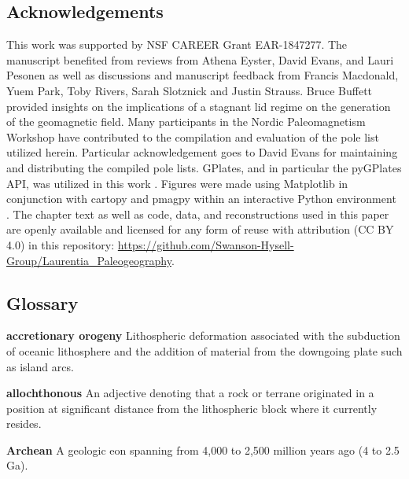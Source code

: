 \documentclass[twocolumn, switch]{article} %
\begin{document}

\footnotesize
\subsection*{Acknowledgements}
This work was supported by NSF CAREER Grant EAR-1847277. The manuscript benefited from reviews from Athena Eyster, David Evans, and Lauri Pesonen as well as discussions and manuscript feedback from Francis Macdonald, Yuem Park, Toby Rivers, Sarah Slotznick and Justin Strauss. Bruce Buffett provided insights on the implications of a stagnant lid regime on the generation of the geomagnetic field. Many participants in the Nordic Paleomagnetism Workshop have contributed to the compilation and evaluation of the pole list utilized herein. Particular acknowledgement goes to David Evans for maintaining and distributing the compiled pole lists. GPlates, and in particular the pyGPlates API, was utilized in this work \citep{Muller2018b}. Figures were made using Matplotlib \citep{Hunter2007a} in conjunction with cartopy \citep{Met-Office2010a} and pmagpy \citep{Tauxe2016a} within an interactive Python environment \citep{Perez2007a}. The chapter text as well as code, data, and reconstructions used in this paper are openly available and licensed for any form of reuse with attribution (CC BY 4.0) in this repository: \url{https://github.com/Swanson-Hysell-Group/Laurentia_Paleogeography}.

\printendnotes

\subsection*{Glossary}
\noindent\textbf{accretionary orogeny } Lithospheric deformation associated with the subduction of oceanic lithosphere and the addition of material from the downgoing plate such as island arcs.

\noindent\textbf{allochthonous } An adjective denoting that a rock or terrane originated in a position at significant distance from the lithospheric block where it currently resides.

\noindent\textbf{Archean } A geologic eon spanning from 4,000 to 2,500 million years ago (4 to 2.5 Ga).
\end{document}
